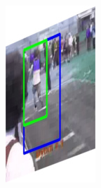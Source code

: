 \documentclass{report}
\begin{document}
\begin{figure}[h]
\begin{subfigure}{0.15\textwidth}
    \includegraphics[width=\textwidth]{output/img_11.jpg}
  \end{subfigure}
  \begin{subfigure}{0.15\textwidth}

\end{subfigure}
\end{figure}
\end{document}
